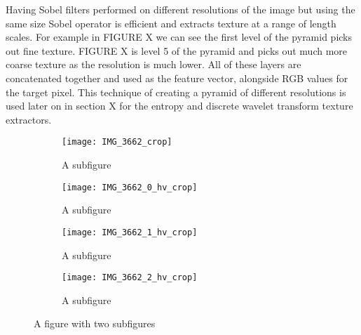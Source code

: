 \documentclass[12pt]{IIBproject}
\begin{document}
 Having Sobel filters performed on different resolutions of the image but using the same size Sobel operator is efficient and extracts texture at a range of length scales. For example in FIGURE X we can see the first level of the pyramid picks out fine texture. FIGURE X is level 5 of the pyramid and picks out much more coarse texture as the resolution is much lower. All of these layers are concatenated together and used as the feature vector, alongside RGB values for the target pixel. This technique of creating a pyramid of different resolutions is used later on in section X for the entropy and discrete wavelet transform texture extractors.
 \begin{figure}[H]
\centering
\begin{subfigure}{.45\textwidth}
  \centering
  \texttt{[image: IMG\_3662\_crop]}
  \caption{A subfigure}
  \label{fig:sub1}
\end{subfigure}%
\begin{subfigure}{.45\textwidth}
  \centering
  \texttt{[image: IMG\_3662\_0\_hv\_crop]}
  \caption{A subfigure}
  \label{fig:sub2}
\end{subfigure}
\begin{subfigure}{.45\textwidth}
  \centering
  \texttt{[image: IMG\_3662\_1\_hv\_crop]}
  \caption{A subfigure}
  \label{fig:sub2}
\end{subfigure}
\begin{subfigure}{.45\textwidth}
  \centering
  \texttt{[image: IMG\_3662\_2\_hv\_crop]}
  \caption{A subfigure}
  \label{fig:sub2}
\end{subfigure}
\caption{A figure with two subfigures}
\label{fig:test}
\end{figure}
\end{document}
